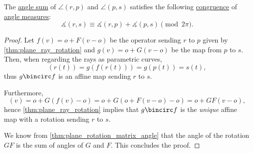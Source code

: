 \begin{proposition}\label{thm:sum_of_angles_measure}
  The \hyperref[def:sum_of_angles]{angle sum} of \( \angle(r, p) \) and \( \angle(p, s) \) satisfies the following \hyperref[def:equivalence_modulo/real_number]{congruence} of \hyperref[def:angle/measure]{angle measures}:
  \begin{equation*}
    \measuredangle(r, s) \equiv \measuredangle(r, p) + \measuredangle(p, s) \pmod {2\pi}.
  \end{equation*}
\end{proposition}
\begin{proof}
  Let \( f(v) = o + F(v - o) \) be the operator sending \( r \) to \( p \) given by \cref{thm:plane_ray_rotation} and \( g(v) = o + G(v - o) \) be the map from \( p \) to \( s \). Then, when regarding the rays as parametric curves,
  \begin{equation*}
    [g \bincirc f](r(t)) = g(f(r(t))) = g(p(t)) = s(t),
  \end{equation*}
  thus \( g \bincirc f \) is an affine map sending \( r \) to \( s \).

  Furthermore,
  \begin{equation*}
    [g \bincirc f](v)
    =
    o + G(f(v) - o)
    =
    o + G(o + F(v - o) - o)
    =
    o + GF(v - o),
  \end{equation*}
  hence \cref{thm:plane_ray_rotation} implies that \( g \bincirc f \) is the \emph{unique} affine map with a rotation sending \( r \) to \( s \).

  We know from \cref{thm:plane_rotation_matrix_angle} that the angle of the rotation \( GF \) is the sum of angles of \( G \) and \( F \). This concludes the proof.
\end{proof}

